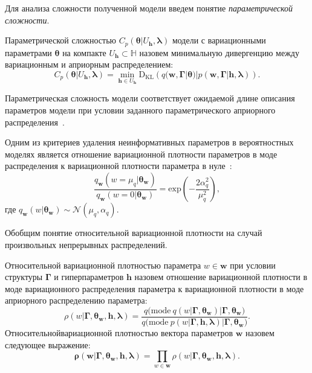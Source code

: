 Для анализа сложности полученной модели введем понятие \textit{параметрической сложности}. 
\begin{defin} 
Параметрической сложностью  $C_p(\boldsymbol{\theta}|U_\mathbf{h},\boldsymbol{\lambda})$ модели с вариационными параметрами $\boldsymbol{\theta}$ на компакте $U_\mathbf{h} \subset \mathbb{H}$ назовем минимальную дивергенцию между вариационным и априорным распределением:
\[
C_p(\boldsymbol{\theta}|U_\mathbf{h},\boldsymbol{\lambda}) = \min_{\mathbf{h} \in U_\mathbf{h}} \text{D}_\text{KL}\left(q(\mathbf{w}, \boldsymbol{\Gamma}|\boldsymbol{\theta})|p(\mathbf{w}, \boldsymbol{\Gamma}|\mathbf{h},\boldsymbol{\lambda})\right).
\]
\end{defin}
Параметрическая сложность модели соответствует ожидаемой длине описания параметров модели при условии заданного параметрического априорного распределения~\cite{hinton_mdl}.

Одним из критериев удаления неинформативных параметров в вероятностных моделях является отношение вариационной плотности параметров в моде распределения к вариационной плотности параметра в нуле~\cite{nips}:
\[\frac{q_\mathbf{w}(w=\mu_q|\boldsymbol{\theta}_\mathbf{w})}{q_\mathbf{w}(w=0|\boldsymbol{\theta}_\mathbf{w})}= \text{exp}\left(-\frac{2\alpha_q^2}{\mu_q^2}\right),
\]
где $q_\mathbf{w}(w|\boldsymbol{\theta}_\mathbf{w}) \sim \mathcal{N}(\mu_q, \alpha_q).$

Обобщим понятие относительной вариационной плотности на случай произвольных непрерывных распределений.
\begin{defin}
Относительной вариационной   плотностью параметра $w \in \mathbf{w}$  при условии структуры $\boldsymbol{\Gamma}$ и гиперпараметров $\mathbf{h}$ назовем отношение вариационной плотности в моде вариационного распределения параметра к вариационной плотности в моде априорного распределению параметра:
\[\rho(w|\boldsymbol{\Gamma},\boldsymbol{\theta}_\mathbf{w}, \mathbf{h},\boldsymbol{\lambda})=\frac{q\bigl(\text{mode}~q\left(w|\boldsymbol{\Gamma}, \boldsymbol{\theta}_\mathbf{w}\right)|\boldsymbol{\Gamma}, \boldsymbol{\theta}_\mathbf{w}\bigr)}{q\bigl(\text{mode}~p\left({w}|\boldsymbol{\Gamma}, \mathbf{h},\boldsymbol{\lambda}\right)|\boldsymbol{\Gamma},\boldsymbol{\theta}_\mathbf{w}\bigr)}.\]
Относительнойвариационной плотностью вектора параметров $\mathbf{w}$ назовем следующее выражение:
\[
    \boldsymbol{\rho}(\mathbf{w}|\boldsymbol{\Gamma}, \boldsymbol{\theta}_\mathbf{w}, \mathbf{h},\boldsymbol{\lambda}) = \prod_{w \in \mathbf{w}}\rho(w|\boldsymbol{\Gamma}, \boldsymbol{\theta}_\mathbf{w}, \mathbf{h},\boldsymbol{\lambda}).
\]

\end{defin}

